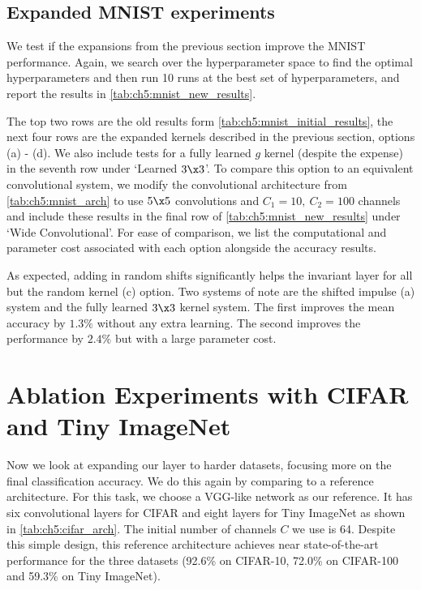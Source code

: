 \subsection{Expanded MNIST experiments}
We test if the expansions from the previous section improve the MNIST
performance. Again, we search over the hyperparameter space to find the optimal
hyperparameters and then run 10 runs at the best set of hyperparameters, and
report the results in \autoref{tab:ch5:mnist_new_results}. 

The top two rows are the old results form
\autoref{tab:ch5:mnist_initial_results}, the next four rows are the expanded
kernels described in the previous section, options (a) - (d). We also include
tests for a fully learned $g$ kernel (despite the expense) in the seventh row
under `Learned $3\x 3$'. To compare this option to an equivalent convolutional
system, we modify the convolutional architecture from
\autoref{tab:ch5:mnist_arch} to use $5\x 5$ convolutions and $C_1 = 10,\ C_2 =
100$ channels and include these results in the final row of
\autoref{tab:ch5:mnist_new_results} under `Wide Convolutional'. For ease of
comparison, we list the computational and parameter cost associated with each
option alongside the accuracy results.

As expected, adding in random shifts significantly helps the invariant layer for all 
but the random kernel (c) option. Two systems of
note are the shifted impulse (a) system and the fully learned $3\x 3$ kernel
system. The first improves the mean accuracy by $1.3\%$ without any extra
learning. The second improves the performance by $2.4\%$ but with a large
parameter cost. 



\section{Ablation Experiments with CIFAR and Tiny ImageNet}\label{sec:ch5:conv_exp}

Now we look at expanding our layer to harder datasets, focusing more on the
final classification accuracy. We do this again by comparing to a reference
architecture. For this task, we choose a VGG-like network as our reference.
It has six convolutional layers for CIFAR and eight layers for Tiny ImageNet as shown in
\autoref{tab:ch5:cifar_arch}. The initial number of channels $C$ we use is 64. Despite
this simple design, this reference architecture achieves near state-of-the-art performance
for the three datasets (92.6\% on CIFAR-10, 72.0\% on CIFAR-100 and 59.3\% on
Tiny ImageNet).

